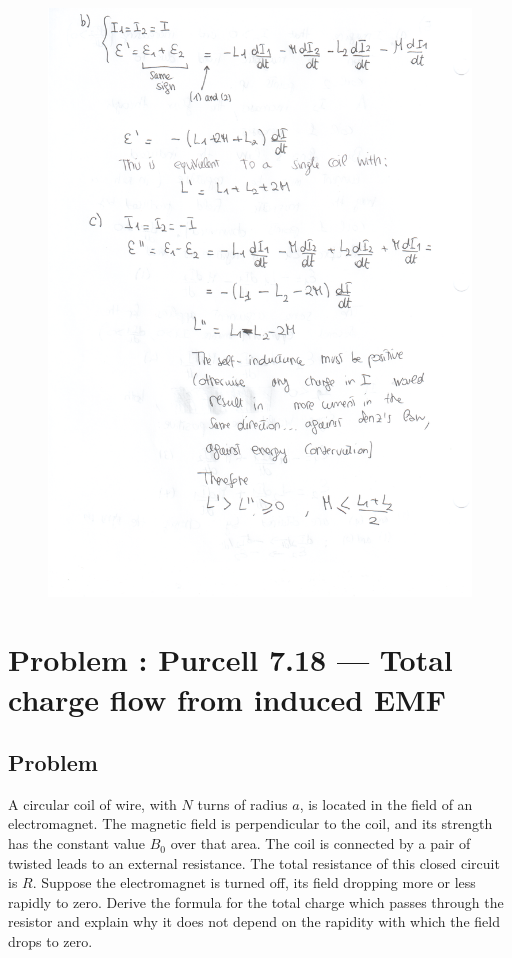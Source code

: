 \documentclass[solutions]{esg8022pset}
\begin{document}
    \begin{figure}[H]
    \centering
    \includegraphics[width = 25cm]{ps9_5b}
  \end{figure}
\section{Problem \thesection: Purcell 7.18 --- Total charge flow from induced EMF}
\subsection{Problem}
A circular coil of wire, with $N$ turns of radius $a$, is located in the field of an electromagnet.
The magnetic field is perpendicular to the coil, and its strength has the constant value $B_{0}$ over that area.
The coil is connected by a pair of twisted leads to an external resistance. The total resistance of this closed
 circuit is $R$. Suppose the electromagnet is turned off, its field dropping more or less rapidly to zero. Derive
  the formula for the total charge which passes through the resistor and explain why it does not depend on the rapidity
  with which the field drops to zero.
\end{document}
